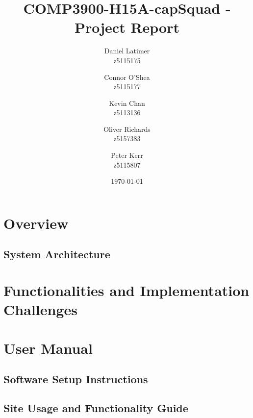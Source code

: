 \documentclass[12pt]{article}
\title{COMP3900-H15A-capSquad - Project Report}
\date{\today}
\author{
    Daniel Latimer \\ z5115175 \and
    Connor O'Shea \\ z5115177 \and
    Kevin Chan \\ z5113136 \and
    Oliver Richards \\ z5157383 \and
    Peter Kerr \\ z5115807}
\begin{document}
\maketitle
\tableofcontents

\newpage


\section{Overview}
\subsection{System Architecture}



\section{Functionalities and Implementation Challenges}



\section{User Manual}

\subsection{Software Setup Instructions}


\subsection{Site Usage and Functionality Guide}
\end{document}
